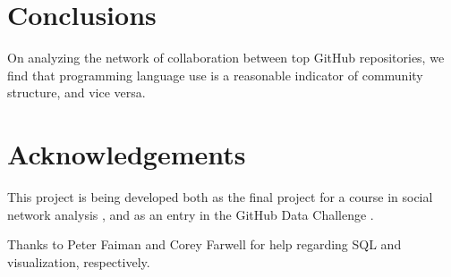 \documentclass[11pt]{article}
\begin{document}
\section{Conclusions}
On analyzing the network of collaboration between top GitHub repositories, we
find that programming language use is a reasonable indicator of community
structure, and vice versa.

\section{Acknowledgements}
This project is being developed both as the final project for a course in social
network analysis \cite{snacourse}, and as an entry in the GitHub Data Challenge
\cite{doll13}.

Thanks to Peter Faiman and Corey Farwell for help regarding SQL and
visualization, respectively.

{\small


}
\end{document}
